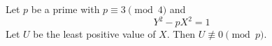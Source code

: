 \begin{conjecture}
    Let $p$ be a prime with $p\equiv3\pmod4$ and
\[
    Y^2-pX^2=1
\]
    Let $U$ be the least positive value of $X$. Then $U\not\equiv0\pmod p$.
\end{conjecture}
